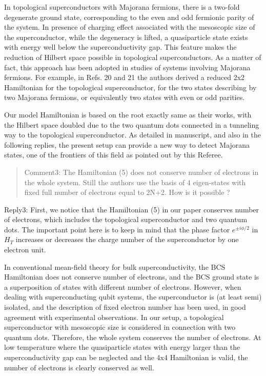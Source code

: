 \documentclass[11pt]{article}
\begin{document}
In topological superconductors with Majorana fermions, there is a
two-fold degenerate ground state, corresponding to the even and odd
fermionic parity of the system. In presence of charging effect
associated with the mesoscopic size of the superconductor, while the
degeneracy is lifted, a quasiparticle state exists with energy well
below the superconductivity gap. This feature makes the reduction of
Hilbert space possible in topological superconductors. As a matter of
fact, this approach has been adopted in studies of systems involving
Majorana fermions. For example, in Refs. 20 and 21 the authors derived a
reduced 2x2 Hamiltonian for the topological superconductor, for the two
states describing by two Majorana fermions, or equivalently two states
with even or odd parities.

Our model Hamiltonian is based on the root exactly same as their works,
with the Hilbert space doubled due to the two quantum dots connected in
a tunneling way to the topological superconductor. As detailed in
manuscript, and also in the following replies, the present setup can
provide a new way to detect Majorana states, one of the frontiers of
this field as pointed out by this Referee.

\begin{quote}
Comment3: The Hamiltonian (5) does not conserve number of electrons in
the whole system. Still the authors use the basis of 4 eigen-states with
fixed full number of electrons equal to 2N+2. How is it possible ?
\end{quote}

Reply3: First, we notice that the Hamiltonian (5) in our paper conserves
number of electrons, which includes the topological superconductor and
two quantum dots. The important point here is to keep in mind that the
phase factor \(e^{\pm i\phi/2}\) in \(H_T\) increases or decreases the
charge number of the superconductor by one electron unit.

In conventional mean-field theory for bulk superconductivity, the BCS
Hamiltonian does not conserve number of electrons, and the BCS ground
state is a superposition of states with different number of electrons.
However, when dealing with superconducting qubit systems, the
superconductor is (at least semi) isolated, and the description of fixed
electron number has been used, in good agreement with experimental
observations. In our setup, a topological superconductor with mesoscopic
size is considered in connection with two quantum dots. Therefore, the
whole system conserves the number of electrons. At low temperature where
the quasiparticle states with energy larger than the superconductivity
gap can be neglected and the 4x4 Hamiltonian is valid, the number of
electrons is clearly conserved as well.
\end{document}

